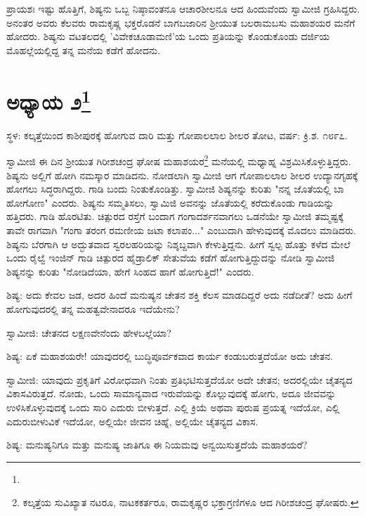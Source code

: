 ಪ್ರಾಯಶಃ ಇಷ್ಟು ಹೊತ್ತಿಗೆ, ಶಿಷ್ಯನು ಒಬ್ಬ ನಿಷ್ಠಾವಂತನೂ ಆಚಾರಶೀಲನೂ ಆದ ಹಿಂದುವೆಂದು ಸ್ವಾಮೀಜಿ ಗ್ರಹಿಸಿದ್ದರು. ಅನಂತರ ಅವರು ಕೆಲವರು ರಾಮಕೃಷ್ಣ ಭಕ್ತರೊಡನೆ ಬಾಗಬಜಾರಿನ ಶ‍್ರೀಯುತ ಬಲರಾಮಬಸು ಮಹಾಶಯರ ಮನೆಗೆ ಹೋದರು. ಶಿಷ್ಯನು ವಟತಲದಲ್ಲಿ 'ವಿವೇಕಚೂಡಾಮಣಿ'ಯ ಒಂದು ಪ್ರತಿಯನ್ನು ಕೊಂಡುಕೊಂಡು ದರ್ಜಿಯ ಮೊಹಲ್ಲೆಯಲ್ಲಿದ್ದ ತನ್ನ ಮನೆಯ ಕಡೆಗೆ ಹೋದನು.

\newpage

\chapter[ಅಧ್ಯಾಯ ೨]{ಅಧ್ಯಾಯ ೨\protect\footnote{}}

\begin{center}
ಸ್ಥಳ: ಕಲ್ಕತ್ತೆಯಿಂದ ಕಾಶೀಪುರಕ್ಕೆ ಹೋಗುವ ದಾರಿ ಮತ್ತು ಗೋಪಾಲಲಾಲ ಶೀಲರ ತೋಟ, ವರ್ಷ: ಕ್ರಿ.ಶ. ೧೮೯೭.
\end{center}

ಸ್ವಾಮೀಜಿ ಈ ದಿನ ಶ‍್ರೀಯುತ ಗಿರೀಶಚಂದ್ರ ಘೋಷ ಮಹಾಶಯರ\footnote{ಕಲ್ಕತ್ತೆಯ ಸುವಿಖ್ಯಾತ ನಟರೂ, ನಾಟಕಕರ್ತರೂ, ರಾಮಕೃಷ್ಣರ ಭಕ್ತಾಗ್ರಣಿಗಳೂ ಆದ ಗಿರೀಶಚಂದ್ರ ಘೋಷರು.} ಮನೆಯಲ್ಲಿ ಮಧ್ಯಾಹ್ನ ವಿಶ್ರಮಿಸಿಕೊಳ್ಳುತ್ತಿದ್ದರು. ಶಿಷ್ಯನು ಅಲ್ಲಿಗೆ ಹೋಗಿ ನಮಸ್ಕಾರ ಮಾಡಿದನು. ನೋಡಲಾಗಿ ಸ್ವಾಮೀಜಿ ಆಗ ಗೋಪಾಲಲಾಲ ಶೀಲರ ಉದ್ಯಾನಗೃಹಕ್ಕೆ ಹೋಗಲು ಸಿದ್ಧರಾಗಿದ್ದರು. ಗಾಡಿ ಬಂದು ನಿಂತುಕೊಂಡಿತ್ತು. ಸ್ವಾಮೀಜಿ ಶಿಷ್ಯನನ್ನು ಕುರಿತು "ನನ್ನ ಜೊತೆಯಲ್ಲಿ ಬಾ ಹೋಗೋಣ" ಎಂದರು. ಶಿಷ್ಯನು ಸಮ್ಮತಿಸಲು, ಸ್ವಾಮಿಜಿ ಅವನನ್ನು ಜೊತೆಯಲ್ಲಿ ಕರೆದುಕೊಂಡು ಗಾಡಿಯನ್ನು ಹತ್ತಿದರು. ಗಾಡಿ ಹೊರಟಿತು. ಚಿತ್ಪುರದ ರಸ್ತೆಗೆ ಬಂದಾಗ ಗಂಗಾದರ್ಶನವಾಗಲು ಒಡನೆಯೇ ಸ್ವಾಮೀಜಿ ತಮ್ಮಷ್ಟಕ್ಕೆ ತಾವೇ ರಾಗವಾಗಿ "ಗಂಗಾ ತರಂಗ ರಮಣೀಯ ಜಟಾ ಕಲಾಪಂ..." ಎಂಬುದಾಗಿ ಹೇಳುವುದಕ್ಕೆ ಮೊದಲು ಮಾಡಿದರು. ಶಿಷ್ಯನು ಬೆರಗಾಗಿ ಆ ಅದ್ಭುತವಾದ ಸ್ವರಲಹರಿಯನ್ನು ನಿಶ್ಶಬ್ದವಾಗಿ ಕೇಳುತ್ತಿದ್ದನು. ಹೀಗೆ ಸ್ವಲ್ಪ ಹೊತ್ತು ಕಳೆದ ಮೇಲೆ ಒಂದು ರೈಲ್ವೆ ಇಂಜಿನ್ ಗಾಡಿ ಚಿತ್ಪುರದ ಹೈಡ್ರಾಲಿಕ್ ಸೇತುವೆಯ ಕಡೆಗೆ ಹೋಗುತ್ತಿದ್ದುದನ್ನು ನೋಡಿ ಸ್ವಾಮೀಜಿ ಶಿಷ್ಯನನ್ನು ಕುರಿತು "ನೋಡಿದೆಯಾ, ಹೇಗೆ ಸಿಂಹದ ಹಾಗೆ ಹೋಗುತ್ತಿದೆ!" ಎಂದರು.

ಶಿಷ್ಯ: ಅದು ಕೇವಲ ಜಡ, ಅದರ ಹಿಂದೆ ಮನುಷ್ಯನ ಚೇತನ ಶಕ್ತಿ ಕೆಲಸ ಮಾಡದಿದ್ದರೆ ಅದು ನಡೆದೀತೆ? ಅದು ಹೀಗೆ ಹೋಗುವುದರಲ್ಲಿ ತನ್ನ ಮಹತ್ವವೇನಾದರೂ ಇದೆಯೇನು?

ಸ್ವಾಮೀಜಿ: ಚೇತನದ ಲಕ್ಷಣವೇನೆಂದು ಹೇಳಬಲ್ಲೆಯಾ?

ಶಿಷ್ಯ: ಏಕೆ ಮಹಾಶಯರೇ! ಯಾವುದರಲ್ಲಿ ಬುದ್ಧಿಪೂರ್ವಕವಾದ ಕಾರ್ಯ ಕಂಡುಬರುತ್ತದೆಯೋ ಅದು ಚೇತನ.

ಸ್ವಾಮೀಜಿ: ಯಾವುದು ಪ್ರಕೃತಿಗೆ ವಿರೋಧವಾಗಿ ನಿಂತು ಪ್ರತಿಭಟಿಸುತ್ತದೆಯೋ ಅದೇ ಚೇತನ; ಅದರಲ್ಲಿಯೇ ಚೈತನ್ಯದ ವಿಕಾಸವಿರುತ್ತದೆ. ನೋಡು, ಒಂದು ಸಾಮಾನ್ಯವಾದ ಇರುವೆಯನ್ನು ಕೊಲ್ಲುವುದಕ್ಕೆ ಹೋಗು, ಅದೂ ಜೀವವನ್ನು ಉಳಿಸಿಕೊಳ್ಳುವುದಕ್ಕೆ ಒಂದು ಸಾರಿ ಎದುರು ಬೀಳುತ್ತದೆ. ಎಲ್ಲಿ ಕ್ರಿಯೆ ಅಥವಾ ಪುರುಷ ಪ್ರಯತ್ನ ಇದೆಯೋ, ಎಲ್ಲಿ ಎದುರುಬೀಳುವಿಕೆ ಇದೆಯೋ, ಅಲ್ಲಿಯೇ ಜೀವನ ಚಿಹ್ನೆ, ಅಲ್ಲಿಯೇ ಚೈತನ್ಯದ ವಿಕಾಸ.

ಶಿಷ್ಯ: ಮನುಷ್ಯನಿಗೂ ಮತ್ತು ಮನುಷ್ಯ ಜಾತಿಗೂ ಈ ನಿಯಮವು ಅನ್ವಯಿಸುತ್ತದೆಯೆ ಮಹಾಶಯರೆ?

